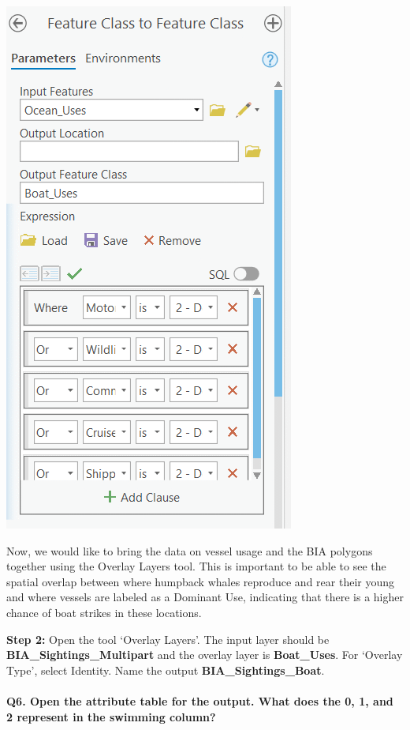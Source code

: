 \documentclass[
]{book}
\begin{document}
\includegraphics[width=0.5\linewidth]{images/05-feature-class-to-feature-class}

Now, we would like to bring the data on vessel usage and the BIA polygons together using the Overlay Layers tool. This is important to be able to see the spatial overlap between where humpback whales reproduce and rear their young and where vessels are labeled as a Dominant Use, indicating that there is a higher chance of boat strikes in these locations.

\textbf{Step 2:} Open the tool `Overlay Layers'. The input layer should be \textbf{BIA\_Sightings\_Multipart} and the overlay layer is \textbf{Boat\_Uses}. For `Overlay Type', select Identity. Name the output \textbf{BIA\_Sightings\_Boat}.

\hypertarget{q6.-open-the-attribute-table-for-the-output.-what-does-the-0-1-and-2-represent-in-the-swimming-column}{%
\paragraph*{Q6. Open the attribute table for the output. What does the 0, 1, and 2 represent in the swimming column?}\label{q6.-open-the-attribute-table-for-the-output.-what-does-the-0-1-and-2-represent-in-the-swimming-column}}
\end{document}

